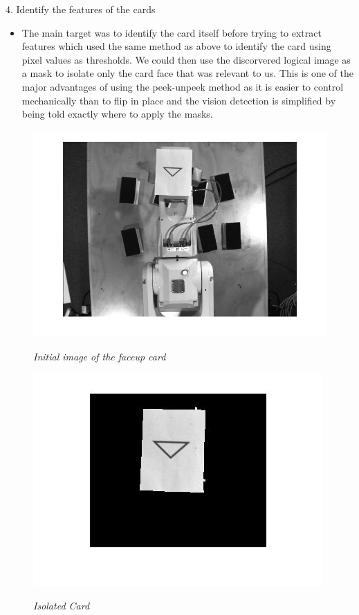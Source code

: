 4.	Identify the features of the cards
\begin{itemize}
	\item The main target was to identify the card itself before trying to extract features which used the same method as above to identify the card using pixel values as thresholds. We could then use the discorvered logical image as a mask to isolate only the card face that was relevant to us. This is one of the major advantages of using the peek-unpeek method as it is easier to control mechanically than to flip in place and the vision detection is simplified by being told exactly where to apply the masks.

\end{itemize}
\begin{figure}[position = here]
	\begin{centering}
		\includegraphics[scale=0.3]{./sachiths_images/image5.png}\\
		\caption[]{\textit{Initial image of the faceup card\label{imFup1}}}
	\end{centering}
\end{figure}
\begin{figure}[position = here]
	\begin{centering}
		\includegraphics[scale=0.5]{./sachiths_images/image6.png}\\
		\caption[]{\textit{Isolated Card\label{isol1}}}
	\end{centering}
\end{figure}

